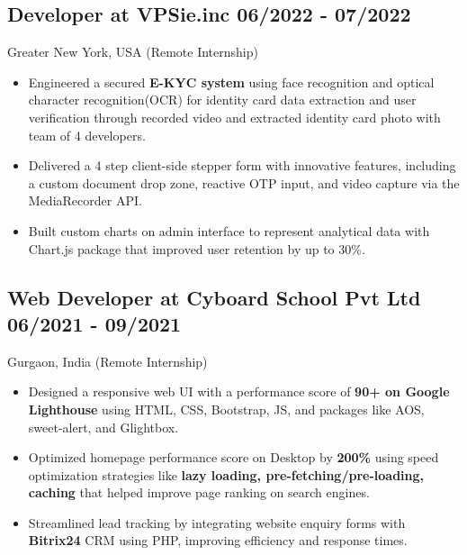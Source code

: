 \documentclass[a4,10pt]{article}
\newcommand{\subtext}[1]{
#1\par\vspace{-0.2cm}}
\newenvironment{zitemize}{
\begin{itemize}\itemsep0pt \parskip0pt \parsep1pt}
{\end{itemize}\vspace{-0.5cm}}
\begin{document}
\subsection*{Developer at VPSie.inc \hfill 06/2022 - 07/2022} 
\subtext{Greater New York, USA {\normalsize\normalfont (Remote Internship) }} 
    \begin{zitemize}
        \item Engineered a secured \textbf{E-KYC system} using face recognition and optical character recognition(OCR) for identity card data extraction and user verification through recorded video and extracted identity card photo with team of 4 developers.
        \item Delivered a 4 step client-side stepper form with innovative features, including a custom document drop zone, reactive OTP input, and video capture via the MediaRecorder API.
        \item Built custom charts on admin interface to represent analytical data with Chart.js package that improved user retention by up to 30\%.
    \end{zitemize}


\subsection*{Web Developer at Cyboard School Pvt Ltd \hfill 06/2021 - 09/2021} 
\subtext{Gurgaon, India {\normalsize\normalfont (Remote Internship) }}
    \begin{zitemize}
        \item Designed a responsive web UI with a performance score of \textbf{90+ on Google Lighthouse} using HTML, CSS, Bootstrap, JS, and packages like AOS, sweet-alert, and Glightbox. 
        \item Optimized homepage performance score on Desktop by \textbf{200\%} using speed optimization strategies like \textbf{lazy loading, pre-fetching/pre-loading, caching} that helped improve page ranking on search engines.
        \item Streamlined lead tracking by integrating website enquiry forms with \textbf{Bitrix24} CRM using PHP, improving efficiency and response times.
    \end{zitemize}




\end{document}
